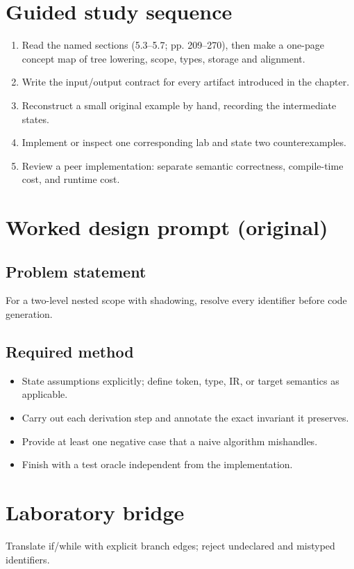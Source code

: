 \documentclass[10pt,letterpaper]{article}
\begin{document}
\section{Guided study sequence}
\begin{enumerate}
\item Read the named sections (5.3--5.7; pp. 209--270), then make a one-page concept map of tree lowering, scope, types, storage and alignment.
\item Write the input/output contract for every artifact introduced in the chapter.
\item Reconstruct a small original example by hand, recording the intermediate states.
\item Implement or inspect one corresponding lab and state two counterexamples.
\item Review a peer implementation: separate semantic correctness, compile-time cost, and runtime cost.
\end{enumerate}

\section{Worked design prompt (original)}
\subsection{Problem statement}
For a two-level nested scope with shadowing, resolve every identifier before code generation.
\subsection{Required method}
\begin{itemize}
\item State assumptions explicitly; define token, type, IR, or target semantics as applicable.
\item Carry out each derivation step and annotate the exact invariant it preserves.
\item Provide at least one negative case that a naive algorithm mishandles.
\item Finish with a test oracle independent from the implementation.
\end{itemize}


\section{Laboratory bridge}
Translate if/while with explicit branch edges; reject undeclared and mistyped identifiers.
\end{document}

